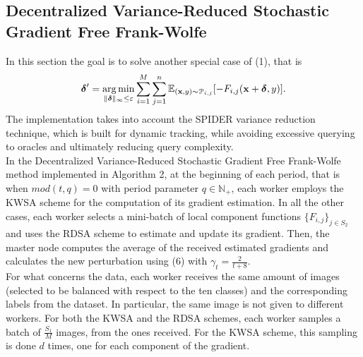 \subsection{Decentralized Variance-Reduced Stochastic Gradient Free Frank-Wolfe}
In this section the goal is to solve another special case of (1), that is
\begin{equation}
	\mbox{\boldmath$ \delta$}' = \operatorname*{arg\,min}_{\lVert \mbox{\boldmath$\scriptstyle \delta$}\rVert_{\infty}\leq\varepsilon} \sum_{i=1}^M \sum_{j=1}^n \mathbb{E}_{(\mathbf{x},y)\sim \mathcal{P}_{i,j}}[- F_{i,j}(\mathbf{x}+\mbox{\boldmath$ \delta$},y)].
\end{equation}
The implementation takes into account the SPIDER variance reduction technique, which is built for dynamic tracking, while avoiding excessive querying to oracles and ultimately reducing query complexity.\\
In the Decentralized Variance-Reduced Stochastic Gradient Free Frank-Wolfe method implemented in Algorithm 2,
at the beginning of each period, that is when $mod(t,q)=0$ with period parameter $q \in \mathbb{N}_{+}$, each worker employs the KWSA scheme for the computation of its gradient estimation. In all the other cases, each worker selects a mini-batch of local component functions $\{F_{i,j}\}_{j\in S_2}$ and uses the RDSA scheme to estimate and update its gradient. Then, the master node computes the average of the received estimated gradients and calculates the new perturbation using (6) with $\gamma_t = \frac{2}{t+8}$.\\
For what concerns the data, each worker receives the same amount of images (selected to be balanced with respect to the ten classes) and the corresponding labels from the dataset. In particular, the same image is not given to different workers. For both the KWSA and the RDSA schemes, each worker samples a batch of $\frac{S_1}{M}$ images, from the ones received. For the KWSA scheme, this sampling is done $d$ times, one for each component of the gradient.  
